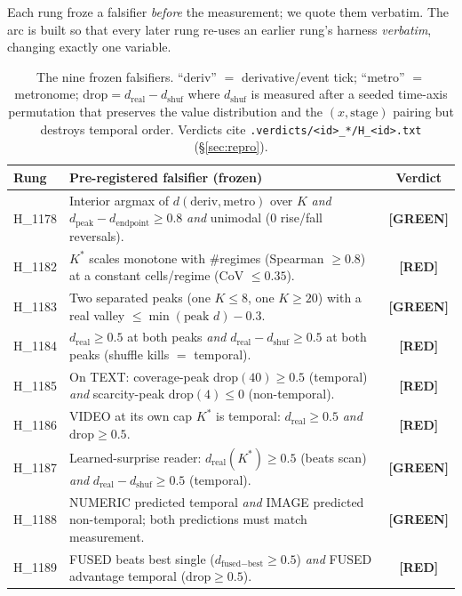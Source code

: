 \documentclass[11pt,a4paper]{article}
\providecommand{\tierGreen}{\textbf{[GREEN]}}
\providecommand{\tierRed}{\textbf{[RED]}}
\newcommand{\dreal}{d_{\mathrm{real}}}
\newcommand{\dshuf}{d_{\mathrm{shuf}}}
\newcommand{\Kstar}{K^{\!*}}
\begin{document}
Each rung froze a falsifier \emph{before} the measurement; we quote them verbatim.
The arc is built so that every later rung re-uses an earlier rung's harness
\emph{verbatim}, changing exactly one variable.

\begin{table}[h]
\centering\small
\renewcommand{\arraybackslash}{}
\begin{tabular}{@{}l p{8.2cm} c@{}}
\toprule
\textbf{Rung} & \textbf{Pre-registered falsifier (frozen)} & \textbf{Verdict} \\
\midrule
H\_1178 & Interior argmax of $d(\text{deriv},\text{metro})$ over $K$ \emph{and}
  $d_{\mathrm{peak}}{-}d_{\mathrm{endpoint}}\!\geq\!0.8$ \emph{and} unimodal
  (0 rise/fall reversals). & \tierGreen \\
H\_1182 & $\Kstar$ scales monotone with \#regimes (Spearman $\geq 0.8$) at a
  constant cells/regime (CoV $\leq 0.35$). & \tierRed \\
H\_1183 & Two separated peaks (one $K\!\leq\!8$, one $K\!\geq\!20$) with a real
  valley $\leq \min(\text{peak } d){-}0.3$. & \tierGreen \\
H\_1184 & $\dreal\!\geq\!0.5$ at both peaks \emph{and} $\dreal{-}\dshuf\!\geq\!0.5$
  at both peaks (shuffle kills $=$ temporal). & \tierRed \\
H\_1185 & On TEXT: coverage-peak $\text{drop}(40)\!\geq\!0.5$ (temporal)
  \emph{and} scarcity-peak $\text{drop}(4)\!\leq\!0$ (non-temporal). & \tierRed \\
H\_1186 & VIDEO at its own cap $\Kstar$ is temporal:
  $\dreal\!\geq\!0.5$ \emph{and} $\text{drop}\!\geq\!0.5$. & \tierRed \\
H\_1187 & Learned-surprise reader: $\dreal(\Kstar)\!\geq\!0.5$ (beats scan)
  \emph{and} $\dreal{-}\dshuf\!\geq\!0.5$ (temporal). & \tierGreen \\
H\_1188 & NUMERIC predicted temporal \emph{and} IMAGE predicted non-temporal;
  both predictions must match measurement. & \tierGreen \\
H\_1189 & FUSED beats best single ($d_{\text{fused}-\text{best}}\!\geq\!0.5$)
  \emph{and} FUSED advantage temporal ($\text{drop}\!\geq\!0.5$). & \tierRed \\
\bottomrule
\end{tabular}
\caption{The nine frozen falsifiers. ``deriv'' $=$ derivative/event tick;
``metro'' $=$ metronome; $\text{drop}=\dreal-\dshuf$ where $\dshuf$ is measured
after a seeded time-axis permutation that preserves the value distribution and the
$(x,\text{stage})$ pairing but destroys temporal order. Verdicts cite
\texttt{.verdicts/<id>\_*/H\_<id>.txt} (\S\ref{sec:repro}).}
\label{tab:falsifiers}
\end{table}
\end{document}

